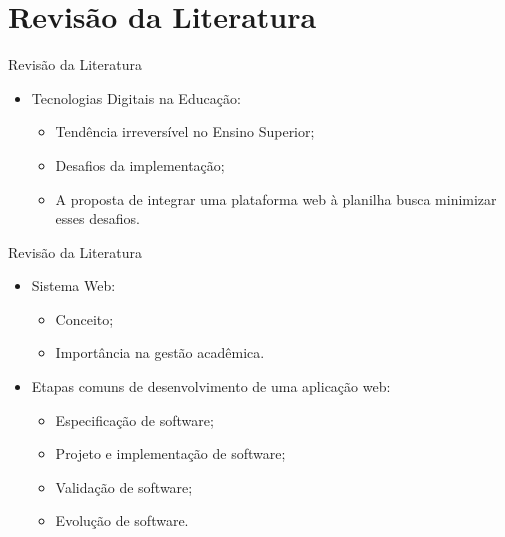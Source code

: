 \section{Revisão da Literatura}

\begin{frame}{Revisão da Literatura}
    \begin{itemize}
        \item Tecnologias Digitais na Educação: \vspace{0.5cm}
              \begin{itemize}
                  \item Tendência irreversível no Ensino Superior; \vspace{0.5cm}
                  \item Desafios da implementação; \vspace{0.5cm}
                  \item A proposta de integrar uma plataforma web à planilha busca minimizar esses desafios. \vspace{0.5cm}
              \end{itemize}
    \end{itemize}
\end{frame}

\begin{frame}{Revisão da Literatura}
    \begin{itemize}
        \item Sistema Web: \vspace{0.25cm}
              \begin{itemize}
                  \item Conceito; \vspace{0.25cm}
                  \item Importância na gestão acadêmica. \vspace{0.25cm}
              \end{itemize}
        \item Etapas comuns de desenvolvimento de uma aplicação web: \vspace{0.25cm}
              \begin{itemize}
                  \item Especificação de software; \vspace{0.25cm}
                  \item Projeto e implementação de software; \vspace{0.25cm}
                  \item Validação de software; \vspace{0.25cm}
                  \item Evolução de software. \vspace{0.25cm}
              \end{itemize}
    \end{itemize}
\end{frame}

